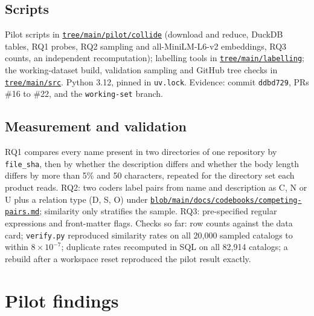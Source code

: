 \documentclass[10pt]{article}
\newcommand{\repo}[1]{\href{https://github.com/Naalu/agent-skill-conflicts/#1}{\texttt{#1}}}
\begin{document}
\subsection{Scripts}
Pilot scripts in \repo{tree/main/pilot/collide} (download and reduce, DuckDB tables, RQ1 probes, RQ2 sampling and
all-MiniLM-L6-v2 embeddings, RQ3 counts, an independent recomputation); labelling tools in \repo{tree/main/labelling};
the working-dataset build, validation sampling and GitHub tree checks in \repo{tree/main/src}. Python 3.12, pinned in
\texttt{uv.lock}. Evidence: commit \texttt{ddbd729}, PRs \#16 to \#22, and the \texttt{working-set} branch.

\subsection{Measurement and validation}
RQ1 compares every name present in two directories of one repository by \texttt{file\_sha}, then by whether the
description differs and whether the body length differs by more than 5\% and 50 characters, repeated for the directory
set each product reads. RQ2: two coders label pairs from name and description as C, N or U plus a relation type (D, S,
O) under \repo{blob/main/docs/codebooks/competing-pairs.md}; similarity only stratifies the sample. RQ3: pre-specified
regular expressions and front-matter flags. Checks so far: row counts against the data card; \texttt{verify.py}
reproduced similarity rates on all 20,000 sampled catalogs to within $8\times10^{-7}$; duplicate rates recomputed in SQL
on all 82,914 catalogs; a rebuild after a workspace reset reproduced the pilot result exactly.

\section{Pilot findings}
\end{document}
